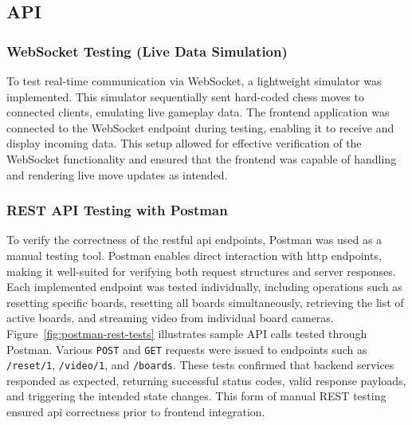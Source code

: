 \subsection{API}
\label{subsec:api-methods}

\subsubsection*{WebSocket Testing (Live Data Simulation)}
\label{subsubsec:websocket-methods}

To test real-time communication via WebSocket, a lightweight simulator was implemented. This simulator sequentially sent hard-coded chess moves to connected clients, emulating live gameplay data. The frontend application was connected to the WebSocket endpoint during testing, enabling it to receive and display incoming data. This setup allowed for effective verification of the WebSocket functionality and ensured that the frontend was capable of handling and rendering live move updates as intended.

\subsubsection*{REST API Testing with Postman}
\label{subsubsec:rest-api-methods}

To verify the correctness of the \gls{rest}ful \gls{api} endpoints, Postman was used as a manual testing tool. Postman enables direct interaction with \gls{http} endpoints, making it well-suited for verifying both request structures and server responses. Each implemented endpoint was tested individually, including operations such as resetting specific boards, resetting all boards simultaneously, retrieving the list of active boards, and streaming video from individual board cameras. \\

Figure~\ref{fig:postman-rest-tests} illustrates sample API calls tested through Postman. Various \texttt{POST} and \texttt{GET} requests were issued to endpoints such as \texttt{/reset/1}, \texttt{/video/1}, and \texttt{/boards}. These tests confirmed that backend services responded as expected, returning successful status codes, valid response payloads, and triggering the intended state changes. This form of manual REST testing ensured \gls{api} correctness prior to frontend integration.

